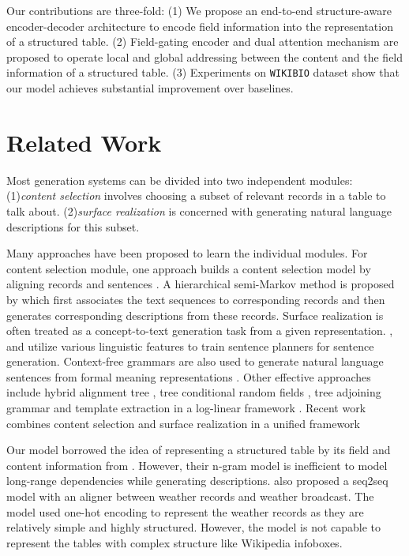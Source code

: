 \documentclass[letterpaper]{article} \usepackage{aaai18}  \usepackage{times}  \usepackage{helvet}  \usepackage{courier}  \usepackage{url}  \usepackage{graphicx}  \frenchspacing  \setlength{\pdfpagewidth}{8.5in}  \setlength{\pdfpageheight}{11in}  \usepackage{amsmath}
\begin{document}
Our contributions are three-fold:
(1) We propose an end-to-end structure-aware encoder-decoder architecture to encode field information into the representation of a structured table.
(2) Field-gating encoder and dual attention mechanism are proposed to operate local and global addressing between the content and the field information of a structured table. 
(3) Experiments on \texttt{WIKIBIO} dataset show that our model achieves substantial improvement over baselines.
 


\section{Related Work}
Most generation systems can be divided into two independent modules: 
(1)\textit{content selection} involves choosing a subset of relevant records in a table to talk about.
(2)\textit{surface realization} is concerned with generating natural language descriptions for this subset.

Many approaches have been proposed to learn the individual modules. 
For content selection module, one approach builds a content selection model by aligning records and sentences \cite{barzilay2005collective,duboue2002content}. 
A hierarchical semi-Markov method is proposed by \cite{liang2009learning} which first associates the text sequences to corresponding records and then generates corresponding descriptions from these records.
Surface realization is often treated as a concept-to-text generation task from a given representation. 
\citeauthor{reiter2000building} , \citeauthor{walker2001spot}  and \citeauthor{stent2004trainable}  utilize various linguistic features to train sentence planners for sentence generation. 
Context-free grammars are also used to generate natural language sentences from formal meaning representations \cite{lu2011probabilistic,belz2008automatic}. 
Other effective approaches include hybrid alignment tree \cite{kim2010generative}, tree conditional random fields \cite{lu2009natural}, tree adjoining grammar \cite{gyawali2016surface} and template extraction in a log-linear framework \cite{angeli2010simple}.
Recent work combines content selection and surface realization in a unified framework \cite{ratnaparkhi2002trainable,konstas2012unsupervised,konstas2013global,DBLP:journals/corr/abs-1709-00155}

Our model borrowed the idea of representing a structured table by its field and content information from \cite{lebret2016neural}. However, 
their n-gram model is inefficient to model long-range dependencies while generating descriptions.
\citeauthor{mei2015talk}  also proposed a seq2seq model with an aligner between weather records and weather broadcast. The model used one-hot encoding to represent the weather records as they are relatively simple and highly structured. However, the model is not capable to represent the tables with complex structure like Wikipedia infoboxes.    
\end{document}
